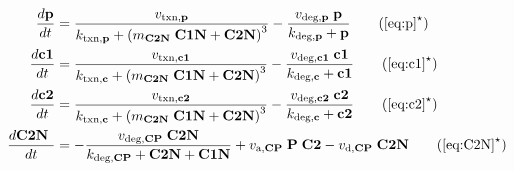 \begin{model}[p]
  \centering

  \begin{align*}
    \frac{d\text{\bf p}}{dt} &= \frac{v_{\text{txn,{\bf p}}}}{k_{\text{txn,{\bf p}}} + \left(m_{\text{\bf C2N}} \; \text{\bf C1N}  + \text{\bf C2N} \right)^3} - \frac{v_{\text{deg,{\bf p}}} \;\text{\bf p} }{k_{\text{deg,{\bf p}}} +\text{\bf p} } \tag{$\ref{eq:p}^{\star}$}\\
    \frac{d\text{\bf c1}}{dt} &= \frac{v_{\text{txn,{\bf c1}}}}{k_{\text{txn,{\bf c}}} + \left(m_{\text{\bf C2N}} \; \text{\bf C1N}  + \text{\bf C2N} \right)^3} - \frac{v_{\text{deg,{\bf c1}}} \;\text{\bf c1} }{k_{\text{deg,{\bf c}}} +\text{\bf c1} } \tag{$\ref{eq:c1}^{\star}$}\\
    \frac{d\text{\bf c2}}{dt} &= \frac{v_{\text{txn,{\bf c2}}}}{k_{\text{txn,{\bf c}}} + \left(m_{\text{\bf C2N}} \; \text{\bf C1N}  + \text{\bf C2N} \right)^3} - \frac{v_{\text{deg,{\bf c2}}} \;\text{\bf c2} }{k_{\text{deg,{\bf c}}} +\text{\bf c2} } \tag{$\ref{eq:c2}^{\star}$}\\
    \frac{d\text{\bf C2N }}{dt} &= - \frac{ v_{\text{deg,{\bf CP}}} \; \text{\bf C2N} }{k_{\text{deg,{\bf CP}}} + \text{\bf C2N}  +\text{\bf C1N} } + v_{\text{a,{\bf CP}}} \;\text{\bf P}  \;\text{\bf C2} - v_{\text{d,{\bf CP}}} \; \text{\bf C2N}
    \tag{$\ref{eq:C2N}^{\star}$}
  \end{align*}
  \label{mod:actfns}
\end{model}


